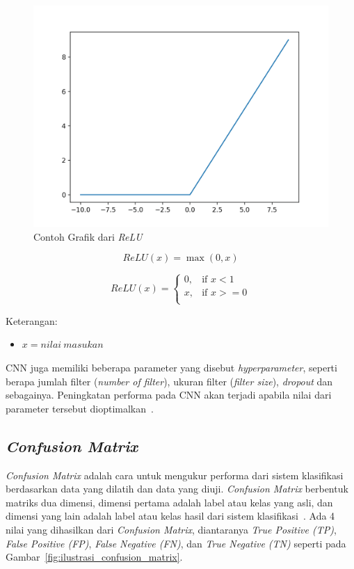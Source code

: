 \begin{figure}[H]
      \centering
      \includegraphics[scale=0.2]{assets/rectified_linear_unit.png}
      \caption{Contoh Grafik dari \emph{ReLU}}
      \label{fig:relu}
\end{figure}

\begin{equation}\label{eq:relu}
      ReLU(x) = \max(0, x)
\end{equation}


\begin{equation}\label{eq:relu2}
      ReLU(x) = \begin{cases}
            0, & \text{if } x < 1  \\
            x, & \text{if } x >= 0 \\
      \end{cases}
\end{equation}

Keterangan:
\begin{itemize}
      \item $x = nilai \ masukan$
\end{itemize}

CNN juga memiliki beberapa parameter yang disebut \emph{hyperparameter}, seperti berapa jumlah filter
(\emph{number of filter}), ukuran filter (\emph{filter size}), \emph{dropout} dan sebagainya.
Peningkatan performa pada CNN akan terjadi apabila nilai dari parameter tersebut
dioptimalkan~\citep{Akhter2020}.

\subsection{\emph{Confusion Matrix}}\label{Confusion Matrix}
\emph{Confusion Matrix} adalah cara untuk mengukur performa dari sistem klasifikasi berdasarkan
data yang dilatih dan data yang diuji. \emph{Confusion Matrix} berbentuk matriks dua dimensi,
dimensi pertama adalah label atau kelas yang asli, dan dimensi yang lain adalah label atau kelas
hasil dari sistem klasifikasi~\citep{Deng2016}. Ada 4 nilai yang dihasilkan dari \emph{Confusion Matrix},
diantaranya \emph{True Positive (TP)}, \emph{False Positive (FP)}, \emph{False Negative (FN)}, dan
\emph{True Negative (TN)} seperti pada Gambar~\ref{fig:ilustrasi_confusion_matrix}.

